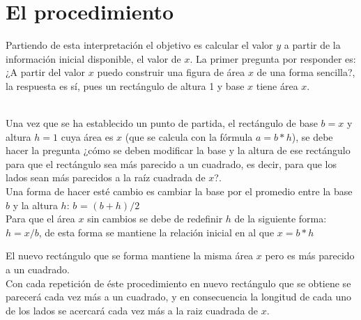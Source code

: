 \documentclass[letter,12pt]{article}
\begin{document}
\section*{El procedimiento}
Partiendo de esta interpretación el objetivo es calcular el valor $y$ a partir de la información inicial disponible, el valor de $x$. La primer pregunta por responder es: ¿A partir del valor $x$ puedo construir una figura de área $x$ de una forma sencilla?, la respuesta es sí, pues un rectángulo de altura 1 y base $x$ tiene área $x$.\\\\
\begin{center}
   { }
\end{center}
Una vez que se ha establecido un punto de partida, el rectángulo de base $b = x$ y altura $h = 1$ cuya área es $x$ (que se calcula con la fórmula $a = b * h$), se debe hacer la pregunta ¿cómo se deben modificar la base y la altura de ese rectángulo para que el rectángulo sea más parecido a un cuadrado, es decir, para que los lados sean más parecidos a la raíz cuadrada de $x$?. \\

Una forma de hacer esté cambio es cambiar la base por el promedio entre la base $b$ y la altura $h$:
$b$ = $(b+h)/2$\\

Para que el área $x$ sin cambios se debe de redefinir $h$ de la siguiente forma: $h = x/b$, de esta forma se mantiene la relación inicial en al que $x = b*h$

El nuevo rectángulo que se forma mantiene la misma área $x$ pero es más parecido a un cuadrado.\\

Con cada repetición de éste procedimiento en nuevo rectángulo que se obtiene se parecerá cada vez más a un cuadrado, y en consecuencia la longitud de cada uno de los lados se acercará cada vez más a la raiz cuadrada de $x$.
 \pagebreak
\end{document}
